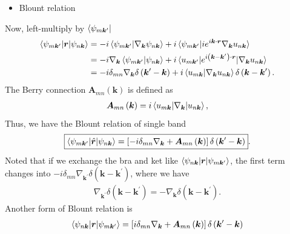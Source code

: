 \documentclass[12pt, oneside]{article}
\newcommand{\pr}{\prime}
\newcommand{\p}[1]{\left(#1\right)}
\newcommand{\bb}[1]{\left[#1\right]}
\numberwithin{equation}{subsection}
\begin{document}
\begin{itemize}
	\item Blount relation
\end{itemize}
Now, left-multiply by \(\bra{\psi_{m \bm{k}^\pr}}\)
\begin{align}
	\begin{split}
		\braket{\psi_{m \bm{k}^\pr} | \bm{r} | \psi_{n \bm{k}}} & = - i \braket{\psi_{m \bm{k}^\pr} | \nabla_{\bm{k}} \psi_{n \bm{k}}} +i \braket{\psi_{m \bm{k}^\pr} |i e^{i \bm{k} \cdot \bm{r}} \nabla_{\bm{k}} u_{n \bm{k}}}  \\
		& =  - i \nabla_{\bm{k}} \braket{\psi_{m \bm{k}^\pr} |  \psi_{n \bm{k}}} + i \braket{u_{m \bm{k}^\pr} | e^{i \p{\bm{k} - \bm{k}^\pr} \cdot \bm{r}} | \nabla_{\bm{k}} u_{n \bm{k}}} \\
		& =  - i \delta_{mn}  \nabla_{\bm{k}} \delta\p{\bm{k}^\pr - \bm{k}} + i \braket{u_{m \bm{k}} | \nabla_{\bm{k}} u_{n \bm{k}}} \delta \p{\bm{k}- \bm{k}^\pr}.
	\end{split}
\end{align}
The Berry connection \(\bm{A}_{mn} \p{\bm{k}}\) is defined as 
\begin{align}
	\bm{A}_{mn} \p{\bm{k}} = i \braket{ u_{ m \bm{k}} | \nabla_{\bm{k}} |  u_{n \bm{k}}},
\end{align}
Thus, we have the Blount relation of single band 
\begin{align}
	\boxed{
		\braket{\psi_{m \bm{k}^\pr} | \hat{\bm{r}} | \psi_{n \bm{k}}} = \bb{-i \delta_{mn} \nabla_{\bm{k}}  + \bm{A}_{mn} \p{\bm{k}} } \delta \p{\bm{k}^\pr - \bm{k}}
	}.
\end{align}
Noted that if we exchange the bra and ket like \(\braket{\psi_{n \bm{k}} | \bm{r} | \psi_{m \bm{k}^\pr}}\), the first term changes into \(- i \delta_{mn} \nabla_{\bm{k}^\pr} \delta \p{\bm{k} - \bm{k}^\pr}\), where we have 
\begin{align}
	\nabla_{\bm{k}^\pr} \delta \p{\bm{k} - \bm{k}^\pr} = - \nabla_{\bm{k}} \delta \p{\bm{k} - \bm{k}^\pr}.
\end{align}
Another form of Blount relation is 
\begin{align}
	\braket{\psi_{n \bm{k}} | \bm{r} | \psi_{m \bm{k}^\pr}} = \bb{i \delta_{mn} \nabla_{\bm{k}}  + \bm{A}_{mn} \p{\bm{k}} } \delta \p{\bm{k}^\pr - \bm{k}}
\end{align}
\end{document}

